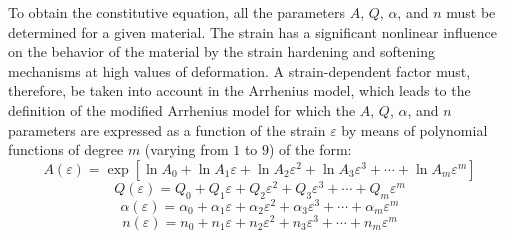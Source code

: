 \documentclass[metals,article,accept,pdftex,moreauthors]{Definitions/mdpi}
\begin{document}
To obtain the constitutive equation, all the parameters $A$, $Q$, $\alpha$, and $n$ must be determined for a given material.
The strain has a significant nonlinear influence on the behavior of the material by the strain hardening and softening mechanisms at high values of deformation.
A strain-dependent factor must, therefore, be taken into account in the Arrhenius model, which leads to the definition of the modified Arrhenius model for which the $A$, $Q$, $\alpha$, and $n$ parameters are expressed as a function of the strain $\varepsilon$ by means of polynomial functions of degree $m$ (varying from $1$ to $9$) of the form:
\begin{equation}
A(\varepsilon) = \exp{\left[\ln\!A_0 + \ln\!A_1\varepsilon + \ln\!A_2\varepsilon^2 + \ln\!A_3\varepsilon^3 + \cdots + \ln\!A_m\varepsilon^m\right]}
\label{eq:ArA}
\end{equation}
\begin{equation}
Q(\varepsilon) = Q_0 + Q_1\varepsilon + Q_2\varepsilon^2 + Q_3\varepsilon^3 + \cdots + Q_m\varepsilon^m
\label{eq:ArQ}
\end{equation}
\begin{equation}
\alpha(\varepsilon) = \alpha_0 + \alpha_1\varepsilon + \alpha_2\varepsilon^2 + \alpha_3\varepsilon^3 + \cdots + \alpha_m\varepsilon^m
\label{eq:Aralpha}
\end{equation}
\begin{equation}
n(\varepsilon) = n_0 + n_1\varepsilon + n_2\varepsilon^2 + n_3\varepsilon^3 + \cdots + n_m\varepsilon^m
\label{eq:Arn}
\end{equation}
\end{document}
